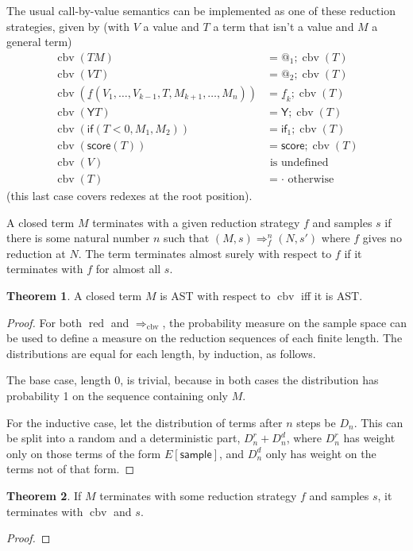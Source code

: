 \documentclass{article}
\newcommand{\tY}{\mathsf{Y}}
\newcommand{\tif}[3]{\mathsf{if}(#1, #2, #3)} %
\newcommand{\tsample}{\mathsf{sample}}
\newcommand{\tscore}{\mathsf{score}}
\DeclareMathOperator{\red}{red}
\DeclareMathOperator{\cbv}{cbv}
\theoremstyle{definition}
\theoremstyle{lemma}
\newtheorem{theorem}{Theorem}
\theoremstyle{remark}
\begin{document}
The usual call-by-value semantics can be implemented as one of these reduction strategies, given by (with $V$ a value and $T$ a term that isn't a value and $M$ a general term)
\begin{align*}
\cbv(T M) & = @_1 ; \cbv(T) \\
\cbv(V T) & = @_2 ; \cbv(T) \\
\cbv(\underline f(V_1, \dots, V_{k-1}, T, M_{k+1}, \dots, M_n)) & = \underline f_k ; \cbv(T) \\
\cbv(\tY T) & = \tY ; \cbv(T) \\
\cbv(\tif{T < 0}{M_1}{M_2}) & = \textsf{if}_1 ; \cbv(T) \\
\cbv(\tscore(T)) & = \tscore ; \cbv(T) \\
\cbv(V) & \text{ is undefined} \\
\cbv(T) & = \cdot \text{ otherwise}
\end{align*}
(this last case covers redexes at the root position).

A closed term $M$ terminates with a given reduction strategy $f$ and samples $s$ if there is some natural number $n$ such that $(M,s) \Rightarrow_f^n (N,s')$ where $f$ gives no reduction at $N$. The term terminates almost surely with respect to $f$ if it terminates with $f$ for almost all $s$.

\begin{theorem} \label{thm:AstEquivalence}
A closed term $M$ is AST with respect to $\cbv$ iff it is AST.
\end{theorem}
\begin{proof}
For both $\red$ and $\Rightarrow_{\cbv}$, the probability measure on the sample space can be used to define a measure on the reduction sequences of each finite length. The distributions are equal for each length, by induction, as follows.

The base case, length 0, is trivial, because in both cases the distribution has probability 1 on the sequence containing only $M$.

For the inductive case, let the distribution of terms after $n$ steps be $D_n$. This can be split into a random and a deterministic part, $D_n^r + D_n^d$, where $D_n^r$ has weight only on those terms of the form $E[\tsample]$, and $D_n^d$ only has weight on the terms not of that form. 
\end{proof}

\begin{theorem} \label{thm:CbvIsTerminatingest}
If $M$ terminates with some reduction strategy $f$ and samples $s$, it terminates with $\cbv$ and $s$.
\end{theorem}
\begin{proof}
\end{proof}
\end{document}
